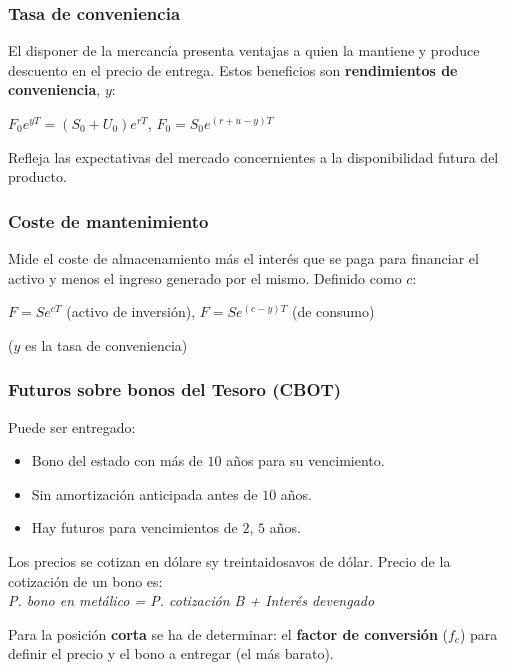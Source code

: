 \documentclass[
10pt, %
a4paper, %
oneside, %
headinclude,footinclude, %
BCOR5mm, %
]{scrartcl}
\newcommand{\n}[1]{\textbf{#1}}
\newcommand{\cur}[1]{\textit{#1}}
\newcommand{\sub}[1]{_{#1}}
\newcommand{\pot}[1]{^{#1}}
\newcommand{\f}[1]{{\large{${#1}$}}}
\newcounter{ex}
\begin{document}
		\subsubsection{Tasa de conveniencia}

			El disponer de la mercancía presenta ventajas a quien la mantiene y produce descuento en el precio de entrega. Estos beneficios son \n{rendimientos de conveniencia}, \f{y}:
			\begin{center} \f{F\sub{0}e\pot{yT} = (S\sub{0}+U\sub{0})e\pot{rT}}, \hspace{0.3cm} \f{F\sub{0} = S\sub{0}e\pot{(r+u-y)T}} \end{center}
			Refleja las expectativas del mercado concernientes a la disponibilidad futura del producto.

		\subsubsection{Coste de mantenimiento}

			Mide el coste de almacenamiento más el interés que se paga para financiar el activo y menos el ingreso generado por el mismo. Definido como \f{c}:
			\begin{center} \f{F = Se\pot{cT}} (activo de inversión), \hspace{0.3cm} \f{F = Se\pot{(c-y)T}} (de consumo) \end{center}
			(\f{y} es la tasa de conveniencia)

		\subsubsection{Futuros sobre bonos del Tesoro (CBOT)}

			Puede ser entregado:
			\begin{itemize}
				\item Bono del estado con más de \f{10} años para su vencimiento.
				\item Sin amortización anticipada antes de \f{10} años.
				\item Hay futuros para vencimientos de \f{2}, \f{5} años.
			\end{itemize}

			Los precios se cotizan en dólare sy treintaidosavos de dólar. Precio de la cotización de un bono es:\\
			\cur{P. bono en metálico = P. cotización B + Interés devengado}

			Para la posición \n{corta} se ha de determinar: el \n{factor de conversión} (\f{f\sub{c}}) para definir el precio y el bono a entregar (el más barato).
\end{document}

